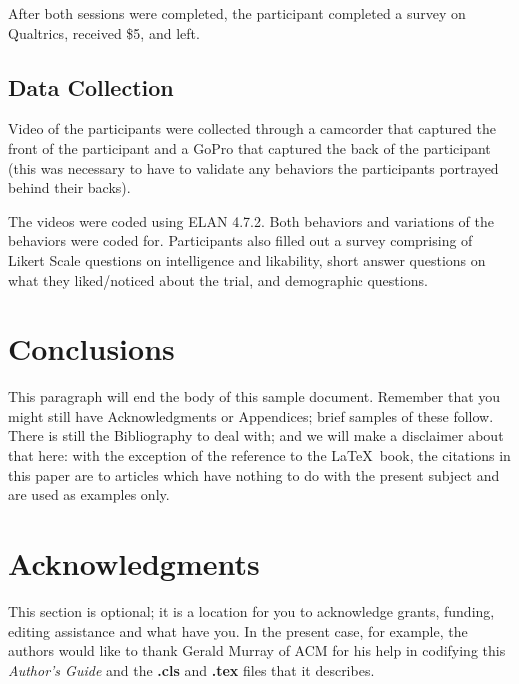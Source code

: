 \documentclass{acm_proc_article-sp}
\begin{document}
After both sessions were completed, the participant completed a survey on Qualtrics, received \$5, and left.

\subsection{Data Collection}
Video of the participants were collected through a camcorder that captured the front of the participant and a GoPro that captured the back of the participant (this was necessary to have to validate any behaviors the participants portrayed behind their backs).

The videos were coded using ELAN 4.7.2. Both behaviors and variations of the behaviors were coded for. Participants also filled out a survey comprising of Likert Scale questions on intelligence and likability, short answer questions on what they liked/noticed about the trial, and demographic questions.

\section{Conclusions}
This paragraph will end the body of this sample document.
Remember that you might still have Acknowledgments or
Appendices; brief samples of these
follow.  There is still the Bibliography to deal with; and
we will make a disclaimer about that here: with the exception
of the reference to the \LaTeX\ book, the citations in
this paper are to articles which have nothing to
do with the present subject and are used as
examples only.

\section{Acknowledgments}
This section is optional; it is a location for you
to acknowledge grants, funding, editing assistance and
what have you.  In the present case, for example, the
authors would like to thank Gerald Murray of ACM for
his help in codifying this \textit{Author's Guide}
and the \textbf{.cls} and \textbf{.tex} files that it describes.

%

%
%
\appendix
\end{document}
